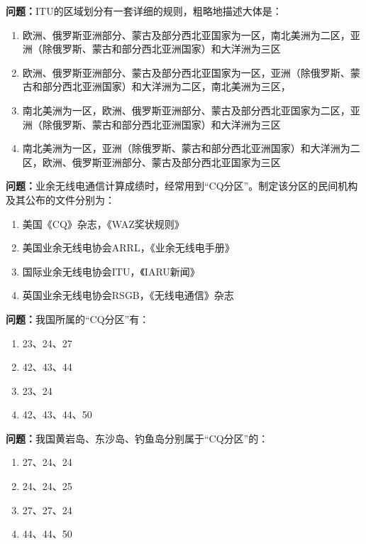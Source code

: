 \noindent\textbf{问题：}ITU的区域划分有一套详细的规则，粗略地描述大体是：
\begin{enumerate}[label=\Alph*), leftmargin=3em]
\item 欧洲、俄罗斯亚洲部分、蒙古及部分西北亚国家为一区，南北美洲为二区，亚洲（除俄罗斯、蒙古和部分西北亚洲国家）和大洋洲为三区
\item 欧洲、俄罗斯亚洲部分、蒙古及部分西北亚国家为一区，亚洲（除俄罗斯、蒙古和部分西北亚洲国家）和大洋洲为二区，南北美洲为三区，
\item 南北美洲为一区，欧洲、俄罗斯亚洲部分、蒙古及部分西北亚国家为二区，亚洲（除俄罗斯、蒙古和部分西北亚洲国家）和大洋洲为三区
\item 南北美洲为一区，亚洲（除俄罗斯、蒙古和部分西北亚洲国家）和大洋洲为二区，欧洲、俄罗斯亚洲部分、蒙古及部分西北亚国家为三区
\end{enumerate}

\bigskip


\noindent\textbf{问题：}业余无线电通信计算成绩时，经常用到“CQ分区”。制定该分区的民间机构及其公布的文件分别为：
\begin{enumerate}[label=\Alph*), leftmargin=3em]
\item 美国《CQ》杂志，《WAZ奖状规则》
\item 美国业余无线电协会ARRL，《业余无线电手册》
\item 国际业余无线电协会ITU，《IARU新闻》
\item 英国业余无线电协会RSGB，《无线电通信》杂志
\end{enumerate}

\bigskip


\noindent\textbf{问题：}我国所属的“CQ分区”有：
\begin{enumerate}[label=\Alph*), leftmargin=3em]
\item 23、24、27
\item 42、43、44
\item 23、24
\item 42、43、44、50
\end{enumerate}

\bigskip


\noindent\textbf{问题：}我国黄岩岛、东沙岛、钓鱼岛分别属于“CQ分区”的：
\begin{enumerate}[label=\Alph*), leftmargin=3em]
\item 27、24、24
\item 24、24、25
\item 27、27、24
\item 44、44、50
\end{enumerate}

